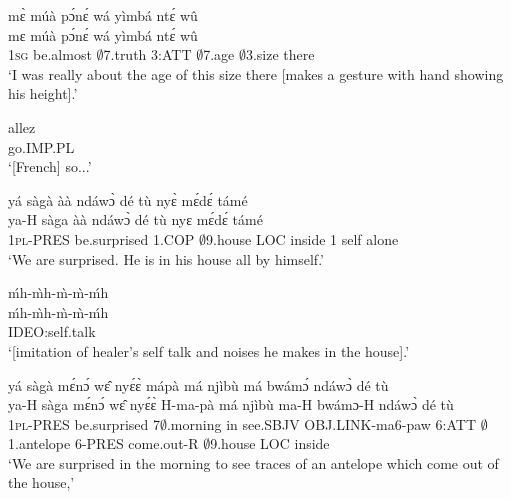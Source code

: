 \begin{exe} 
\exA\label{10}
  \glll mɛ̀ múà pɔ́nɛ́ wá yìmbá ntɛ́ wû  \\
          mɛ múà pɔ́nɛ́ wá yìmbá ntɛ́ wû       \\
         1\textsc{sg} be.almost $\emptyset$7.truth 3:ATT $\emptyset$7.age $\emptyset$3.size there \\
    \trans `I was really about the age of this size there [makes a gesture with hand showing his height].'
\end{exe}

\begin{exe} 
\exA\label{11}
  \gll   allez   \\
           go.IMP.PL      \\
    \trans `[French] so...'
\end{exe}

\begin{exe} 
\exA\label{12}
  \glll   yá sàgà àà ndáwɔ̀ dé tù nyɛ̀ mɛ́dɛ́ támé   \\
           ya-H sàga àà ndáwɔ̀ dé tù nyɛ mɛ́dɛ́ támé      \\
          1\textsc{pl}-PRES be.surprised 1.COP $\emptyset$9.house LOC inside 1 self alone \\
    \trans `We are surprised. He is in his house all by himself.'
\end{exe}

\begin{exe} 
\exA\label{13}
  \glll   ḿh-m̀h-m̀-m̀-ḿh   \\
          ḿh-m̀h-m̀-m̀-ḿh   \\
          IDEO:self.talk \\
    \trans `[imitation of healer's self talk and noises he makes in the house].'
\end{exe}

\begin{exe} 
\exA\label{14} 
  \glll   yá sàgà mɛ́nɔ́ wɛ̂ nyɛ́ɛ̀ mápà má njìbù má bwámɔ́ ndáwɔ̀ dé tù \\
          ya-H sàga mɛ́nɔ́ wɛ̂ nyɛ́ɛ̀ H-ma-pà má njìbù ma-H bwámɔ-H ndáwɔ̀ dé tù     \\
        1\textsc{pl}-PRES be.surprised 7$\emptyset$.morning in see.SBJV OBJ.LINK-ma6-paw 6:ATT $\emptyset$1.antelope 6-PRES come.out-R $\emptyset$9.house LOC inside  \\
    \trans `We are surprised in the morning to see traces of an  antelope which come out of the house,'
\end{exe}

